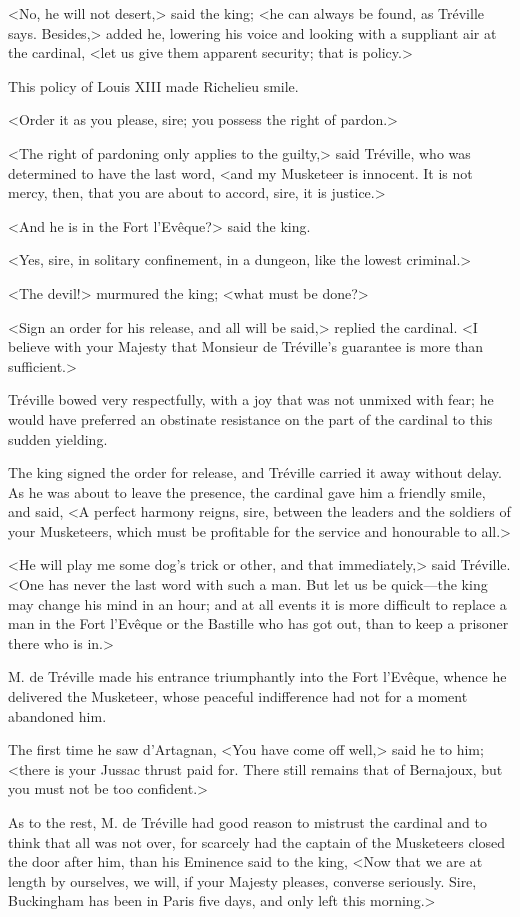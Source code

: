 <No, he will not desert,> said the king; <he can always be found, as Tréville says. Besides,> added he, lowering his voice and looking with a suppliant air at the cardinal, <let us give them apparent security; that is policy.> 

This policy of Louis XIII made Richelieu smile. 

<Order it as you please, sire; you possess the right of pardon.> 

<The right of pardoning only applies to the guilty,> said Tréville, who was determined to have the last word, <and my Musketeer is innocent. It is not mercy, then, that you are about to accord, sire, it is justice.> 

<And he is in the Fort l'Evêque?> said the king. 

<Yes, sire, in solitary confinement, in a dungeon, like the lowest criminal.> 

<The devil!> murmured the king; <what must be done?> 

<Sign an order for his release, and all will be said,> replied the cardinal. <I believe with your Majesty that Monsieur de Tréville's guarantee is more than sufficient.> 

Tréville bowed very respectfully, with a joy that was not unmixed with fear; he would have preferred an obstinate resistance on the part of the cardinal to this sudden yielding. 

The king signed the order for release, and Tréville carried it away without delay. As he was about to leave the presence, the cardinal gave him a friendly smile, and said, <A perfect harmony reigns, sire, between the leaders and the soldiers of your Musketeers, which must be profitable for the service and honourable to all.> 

<He will play me some dog's trick or other, and that immediately,> said Tréville. <One has never the last word with such a man. But let us be quick---the king may change his mind in an hour; and at all events it is more difficult to replace a man in the Fort l'Evêque or the Bastille who has got out, than to keep a prisoner there who is in.> 

M. de Tréville made his entrance triumphantly into the Fort l'Evêque, whence he delivered the Musketeer, whose peaceful indifference had not for a moment abandoned him. 

The first time he saw d'Artagnan, <You have come off well,> said he to him; <there is your Jussac thrust paid for. There still remains that of Bernajoux, but you must not be too confident.> 

As to the rest, M. de Tréville had good reason to mistrust the cardinal and to think that all was not over, for scarcely had the captain of the Musketeers closed the door after him, than his Eminence said to the king, <Now that we are at length by ourselves, we will, if your Majesty pleases, converse seriously. Sire, Buckingham has been in Paris five days, and only left this morning.> 